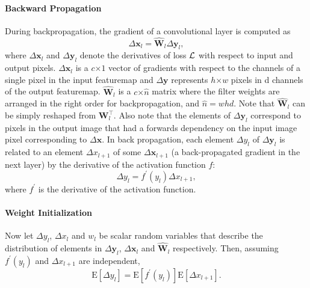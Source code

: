 \documentclass[thesis]{subfiles}
\begin{document}
    \paragraph{Backward Propagation}
    During backpropagation, the gradient of a convolutional layer is computed as
    \begin{equation}
    \Delta \mathbf{x}_l = \hat{\mathbf{W}}_l \Delta \mathbf{y}_l,
    \label{eq:back_prop_gradient}
    \end{equation}
    where $\Delta \mathbf{x}_l$ and $\Delta \mathbf{y}_l$ denote the derivatives of loss $\cal L$ with respect to input and output pixels. $\Delta \mathbf{x}_l$ is a $c$$\times$$1$ vector of gradients with respect to the channels of a single pixel in the input \gls{featuremap} and $\Delta \mathbf{y}$ represents $h$$\times$$w$ pixels in d channels of the output \gls{featuremap}. $\hat{\mathbf{W}}_l$ is a $c$$\times$$\hat{n}$ matrix where the filter weights are arranged in the right order for backpropagation, and $\hat{n} = whd$. Note that $\hat{\mathbf{W}}_l$ can be simply reshaped from $\mathbf{W}_l^\top$. Also note that the elements of $\Delta \mathbf{y}_l$ correspond to pixels in the output image that had a forwards dependency on the input image pixel corresponding to $\Delta \mathbf{x}$. In back propagation, each element $\Delta y_l$ of $\Delta \mathbf{y}_l$ is related to an element $\Delta x_{l+1}$ of some $\Delta \mathbf{x}_{l+1}$ (\ie a back-propagated gradient in the next layer) by the derivative of the activation function $f$:
    \begin{equation}
    \Delta y_l = f^\prime (y_l) \Delta x_{l+1},
    \end{equation}
    where $f^\prime$ is the derivative of the activation function. 
    
    
    \newcommand{\Expect}{\mathrm{E}}
    \newcommand{\Var}{\mathrm{Var}}
    
    \paragraph{Weight Initialization}
    Now let $\Delta y_l$, $\Delta x_l$ and $w_l$ be scalar random variables that describe the distribution of elements in $\Delta \mathbf{y}_l$, $\Delta \mathbf{x}_{l}$ and $\hat{\mathbf{W}}_l$ respectively. Then, assuming $f^\prime (y_l)$ and $\Delta x_{l+1}$ are independent,
    \begin{equation}
    \Expect[\Delta y_l] = \Expect[f^\prime (y_l)] \Expect[ \Delta x_{l+1}].
    \end{equation}
    
\end{document}
